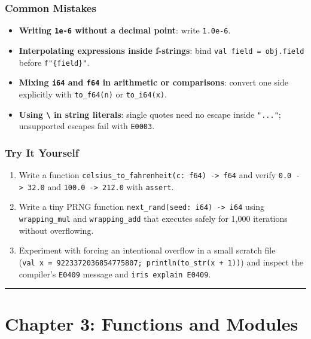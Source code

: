\documentclass[
  english,
  oneside]{book}
\providecommand{\tightlist}{%
  \setlength{\itemsep}{0pt}\setlength{\parskip}{0pt}}
\begin{document}
\subsection{Common Mistakes}\label{common-mistakes-1}

\begin{itemize}
\tightlist
\item
  \textbf{Writing \texttt{1e-6} without a decimal point}: write
  \texttt{1.0e-6}.
\item
  \textbf{Interpolating expressions inside f-strings}: bind
  \texttt{val\ field\ =\ obj.field} before \texttt{f"\{field\}"}.
\item
  \textbf{Mixing \texttt{i64} and \texttt{f64} in arithmetic or
  comparisons}: convert one side explicitly with \texttt{to\_f64(n)} or
  \texttt{to\_i64(x)}.
\item
  \textbf{Using \texttt{\textbackslash{}\textquotesingle{}} in string
  literals}: single quotes need no escape inside \texttt{"..."};
  unsupported escapes fail with \texttt{E0003}.
\end{itemize}

\subsection{Try It Yourself}\label{try-it-yourself-1}

\begin{enumerate}
\def\labelenumi{\arabic{enumi}.}
\tightlist
\item
  Write a function
  \texttt{celsius\_to\_fahrenheit(c:\ f64)\ -\textgreater{}\ f64} and
  verify \texttt{0.0\ -\textgreater{}\ 32.0} and
  \texttt{100.0\ -\textgreater{}\ 212.0} with \texttt{assert}.
\item
  Write a tiny PRNG function
  \texttt{next\_rand(seed:\ i64)\ -\textgreater{}\ i64} using
  \texttt{wrapping\_mul} and \texttt{wrapping\_add} that executes safely
  for 1,000 iterations without overflowing.
\item
  Experiment with forcing an intentional overflow in a small scratch
  file
  (\texttt{val\ x\ =\ 9223372036854775807;\ println(to\_str(x\ +\ 1))})
  and inspect the compiler's \texttt{E0409} message and
  \texttt{iris\ explain\ E0409}.
\end{enumerate}

\begin{center}\rule{0.5\linewidth}{0.5pt}\end{center}

\chapter{Chapter 3: Functions and
Modules}\label{chapter-3-functions-and-modules}
\end{document}
